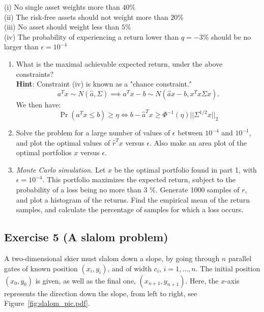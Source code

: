 \documentclass[11pt]{article}
\begin{document}
(i) No single asset weights more than $40\%$ \\
(ii) The risk-free assets should not weight more than $20\%$ \\
(iii) No asset should weight less than $5\%$ \\
(iv) The probability of experiencing a return lower than $q = -3\%$ should be no larger than $\epsilon = 10^{-4}$
\begin{enumerate}
\item
What is the maximal achievable expected return, under the above constraints? \\

\textbf{Hint}: Constraint (iv) is known as a "chance constraint."
\[
a^Tx \sim N(\hat{a}, \Sigma) \implies a^Tx - b \sim N(\hat{a}x - b, x^Tx\Sigma x).
\]
We then have:
\[\Pr(a^Tx \leq b) \geq \eta \iff b - \hat{a}^Tx \geq \Phi^{-1}(\eta)||\Sigma^{1/2}x||_2
\]

\item Solve the problem for a large number of values of $\epsilon$ between $10^{-4}$ and $10^{-1}$, and plot the optimal values of $\hat{r}^Tx$ versus $\epsilon$. Also make an area plot of the optimal portfolios $x$ versus $\epsilon$.

\item \textit{Monte Carlo simulation.} Let $x$ be the optimal portfolio found in part 1, with $\epsilon=10^{-4}$. This portfolio maximizes the expected return, subject to the probability of a loss being no more than 3 $\%$. Generate 1000 samples of $r$, and plot a histogram of the returns. Find the empirical mean of the return samples, and calculate the percentage of samples for which a loss occurs.

\end{enumerate}

\begin{solution}
\end{solution}

\newpage
\subsection*{Exercise 5 (A slalom problem)}

A two-dimensional skier must slalom down a slope, by going through $n$ parallel gates of known position $(x_i,y_i)$, and of width $c_i$, $i=1,\ldots,n$. The initial position $(x_0,y_0)$ is given, as well as the final one, $(x_{n+1},y_{n+1})$. Here, the $x$-axis represents the direction down the slope, from left to right, see Figure~\ref{fig:slalom_pic.pdf}. \\
\end{document}
